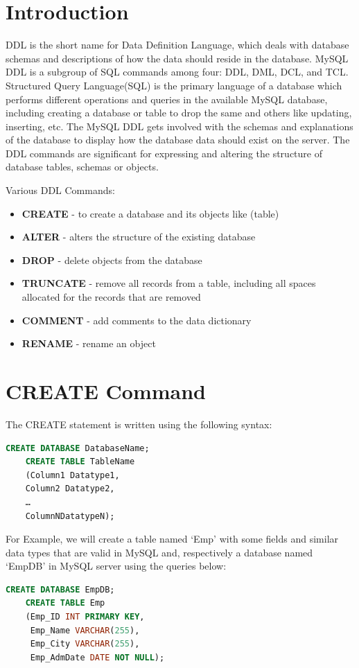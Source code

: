 \section{Introduction}
DDL is the short name for Data Definition Language, which deals with database schemas and descriptions of how the data should reside in the database. MySQL DDL is a subgroup of SQL commands among four: DDL, DML, DCL, and TCL. Structured Query Language(SQL) is the primary language of a database which performs different operations and queries in the available MySQL database, including creating a database or table to drop the same and others like updating, inserting, etc. The MySQL DDL gets involved with the schemas and explanations of the database to display how the database data should exist on the server. The DDL commands are significant for expressing and altering the structure of database tables, schemas or objects.

Various DDL Commands:
\begin{itemize}
	\tightlist
	\item \textbf{CREATE} - to create a database and its objects like (table)
	\item \textbf{ALTER} - alters the structure of the existing database
	\item \textbf{DROP} - delete objects from the database
	\item \textbf{TRUNCATE} - remove all records from a table, including all spaces allocated for the records that are removed
	\item \textbf{COMMENT} - add comments to the data dictionary
	\item \textbf{RENAME} - rename an object	
\end{itemize}

\section{CREATE Command}
The CREATE statement is written using the following syntax:
\begin{lstlisting}[language=sql]
	CREATE DATABASE DatabaseName;
	CREATE TABLE TableName 
	(Column1 Datatype1, 
	Column2 Datatype2,
	…
	ColumnNDatatypeN);
\end{lstlisting}

For Example, we will create a table named ‘Emp’ with some fields and similar data types that are valid in MySQL and, respectively a database named ‘EmpDB’ in MySQL server using the queries below:
\begin{lstlisting}[language=sql]
	CREATE DATABASE EmpDB;
	CREATE TABLE Emp 
	(Emp_ID INT PRIMARY KEY,
	 Emp_Name VARCHAR(255), 
	 Emp_City VARCHAR(255), 
	 Emp_AdmDate DATE NOT NULL);
\end{lstlisting}

